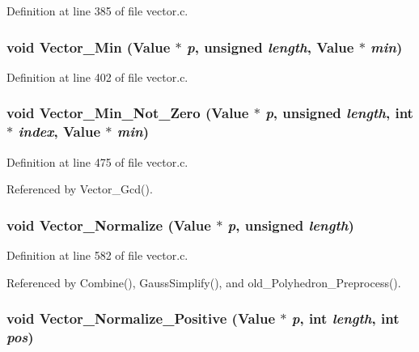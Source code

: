 Definition at line 385 of file vector.c.
\subsubsection{\setlength{\rightskip}{0pt plus 5cm}void Vector\_\-Min (Value $\ast$ {\em p}, unsigned {\em length}, Value $\ast$ {\em min})}\label{vector_8c_a19}




Definition at line 402 of file vector.c.
\subsubsection{\setlength{\rightskip}{0pt plus 5cm}void Vector\_\-Min\_\-Not\_\-Zero (Value $\ast$ {\em p}, unsigned {\em length}, int $\ast$ {\em index}, Value $\ast$ {\em min})}\label{vector_8c_a22}




Definition at line 475 of file vector.c.

Referenced by Vector\_\-Gcd().

\subsubsection{\setlength{\rightskip}{0pt plus 5cm}void Vector\_\-Normalize (Value $\ast$ {\em p}, unsigned {\em length})}\label{vector_8c_a25}




Definition at line 582 of file vector.c.

Referenced by Combine(), Gauss\-Simplify(), and old\_\-Polyhedron\_\-Preprocess().

\subsubsection{\setlength{\rightskip}{0pt plus 5cm}void Vector\_\-Normalize\_\-Positive (Value $\ast$ {\em p}, int {\em length}, int {\em pos})}\label{vector_8c_a26}




